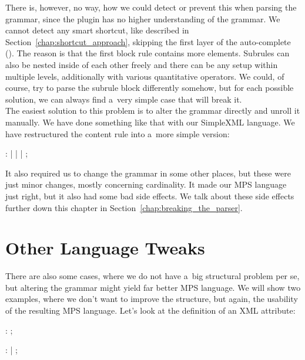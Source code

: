 There is, however, no way, how we could detect or prevent this when parsing the grammar, since the plugin has no higher understanding of the grammar.
We cannot detect any smart shortcut, like described in Section~\ref{chap:shortcut_approach}, skipping the first layer of the auto-complete ().
The reason is that the first block rule contains more elements.
Subrules can also be nested inside of each other freely and there can be any setup within multiple levels, additionally with various quantitative operators.
We could, of course, try to parse the subrule block differently somehow, but for each possible solution, we can always find a~very simple case that will break it.
\\

The easiest solution to this problem is to alter the grammar directly and unroll it manually.
We have done something like that with our SimpleXML language.
We have restructured the content rule into a~more simple version:

\begin{antlr}
	    :   
	           |   
	           |   
	           |   
	           ;
\end{antlr}

It also required us to change the grammar in some other places, but these were just minor changes, mostly concerning cardinality.
It made our MPS language just right, but it also had some bad side effects.
We talk about these side effects further down this chapter in Section~\ref{chap:breaking_the_parser}.

\section{Other Language Tweaks}

There are also some cases, where we do not have a~big structural problem per se, but altering the grammar might yield far better MPS language.
We will show two examples, where we don't want to improve the structure, but again, the usability of the resulting MPS language.
Let's look at the definition of an XML attribute:

\begin{antlr}
	   :    \literal{=}  ;

	      :    \regex{~["]*} 
	            |    \regex{~[']*} 
	            ;
\end{antlr}


